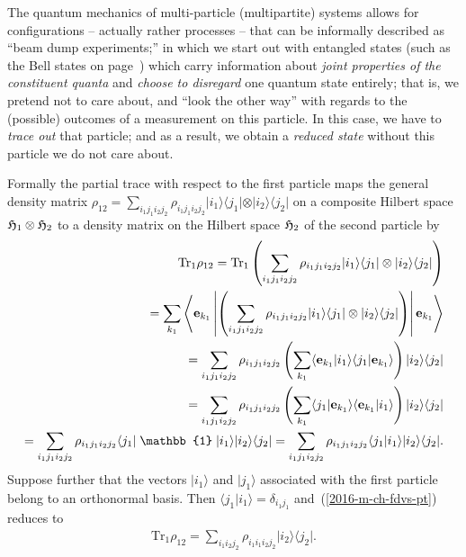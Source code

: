 The quantum mechanics of multi-particle (multipartite) systems allows for configurations -- actually rather processes --
that can be informally described as ``beam dump experiments;'' in which we start out with entangled states
(such as the Bell states on page~\pageref{2014-m-ch-fdvs-bellbasis})  which carry information
about {\em joint properties of the constituent quanta}
and {\em choose to disregard} one quantum state entirely; that is, we pretend
not to care about, and ``look the other way'' with regards to the (possible) outcomes of a measurement on this particle.
In this case, we have to {\em trace out} that particle; and as a result, we obtain a {\em reduced state} without this particle we do
not care about.

Formally the partial trace with respect to the first particle
maps the general density matrix
${ \rho}_{12} = \sum_{i_1 j_1 i_2 j_2} \rho_{i_1 j_1 i_2 j_2}   \vert i_1\rangle \langle j_1\vert \otimes \vert i_2\rangle \langle j_2 \vert$
on a composite Hilbert space
$
{\frak H}_1
\otimes
{\frak H}_2
$
to  a density matrix on the Hilbert space
${\frak H}_2
$ of the second particle by
\begin{equation}
\begin{split}
\textrm{Tr}_1
{ \rho}_{12}
= \textrm{Tr}_1  \left(   \sum_{i_1 j_1 i_2 j_2} \rho_{i_1 j_1 i_2 j_2}   \vert i_1\rangle \langle j_1\vert \otimes \vert i_2 \rangle \langle j_2 \vert \right)
 \\
= \sum_{k_1}   \left\langle {\bf e}_{k_1}  \left\vert \left(   \sum_{i_1 j_1 i_2 j_2} \rho_{i_1 j_1 i_2 j_2}
 \vert i_1\rangle \langle j_1\vert \otimes \vert i_2 \rangle \langle j_2 \vert  \right)  \right\vert {\bf e}_{k_1} \right\rangle
 \\
=  \sum_{i_1 j_1 i_2 j_2} \rho_{i_1 j_1 i_2 j_2}  \left( \sum_{k_1}
 \langle {\bf e}_{k_1}  \vert i_1\rangle \langle j_1\vert    {\bf e}_{k_1}  \rangle  \right)  \vert i_2 \rangle \langle j_2 \vert
 \\
=  \sum_{i_1 j_1 i_2 j_2} \rho_{i_1 j_1 i_2 j_2}  \left( \sum_{k_1}
 \langle j_1\vert    {\bf e}_{k_1}  \rangle  \langle {\bf e}_{k_1}  \vert i_1\rangle \right)  \vert i_2 \rangle \langle j_2 \vert
 \\
=  \sum_{i_1 j_1 i_2 j_2} \rho_{i_1 j_1 i_2 j_2}
 \langle j_1\vert   \; \mathbb{1} \; \vert i_1\rangle   \vert i_2 \rangle \langle j_2 \vert
=  \sum_{i_1 j_1 i_2 j_2} \rho_{i_1 j_1 i_2 j_2}
 \langle j_1 \vert  i_1\rangle    \vert i_2 \rangle \langle j_2 \vert
.
\end{split}
\label{2016-m-ch-fdvs-pt}
\end{equation}
Suppose further that the vectors
$\vert i_1 \rangle$
and
$\vert j_1 \rangle$
associated with the first particle
belong to an orthonormal basis.
Then $\langle j_1 \vert  i_1\rangle =\delta_{i_1 j_1}$ and~(\ref{2016-m-ch-fdvs-pt})
reduces to
\begin{equation}
\begin{split}
\textrm{Tr}_1
{ \rho}_{12}
=  \sum_{i_1 i_2 j_2} \rho_{i_1 i_1 i_2 j_2}
  \vert i_2 \rangle \langle j_2 \vert
.
\end{split}
\label{2016-m-ch-fdvs-pt2}
\end{equation}

